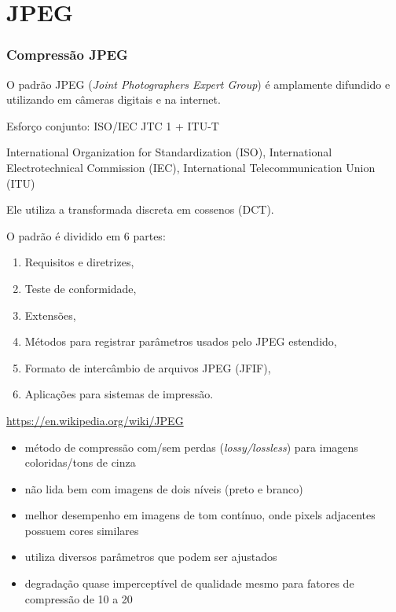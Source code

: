 \section{JPEG}

\begin{frame}[allowframebreaks]
  \frametitle{Compressão JPEG}
  O padrão JPEG (\textit{Joint Photographers Expert Group}) é amplamente difundido e
  utilizando em câmeras digitais e na internet.

  \vspace{0.5cm}
  Esforço conjunto: ISO/IEC JTC 1 + ITU-T

  International Organization for Standardization (ISO), 
  International Electrotechnical Commission (IEC),
  International Telecommunication Union (ITU)

  \vspace{2ex}
  Ele utiliza a transformada discreta em cossenos (DCT).

  \framebreak
  O padrão é dividido em 6 partes: 
  \begin{enumerate}
  \item Requisitos e diretrizes, %
  \item Teste de conformidade, %
  \item Extensões,
  \item Métodos para registrar parâmetros usados pelo JPEG estendido,
  \item Formato de intercâmbio de arquivos JPEG (JFIF),
  \item Aplicações para sistemas de impressão.
  \end{enumerate}

  \url{https://en.wikipedia.org/wiki/JPEG}

  \framebreak

  \begin{itemize}
  \item método de compressão com/sem perdas (\textit{lossy/lossless}) para imagens coloridas/tons de cinza
  \item não lida bem com imagens de dois níveis (preto e branco)
  \item melhor desempenho em imagens de tom contínuo, onde pixels adjacentes possuem cores similares
  \item utiliza diversos parâmetros que podem ser ajustados 
  \item degradação quase imperceptível de qualidade mesmo para fatores de compressão de 10 a 20
  \end{itemize}


\end{frame}
